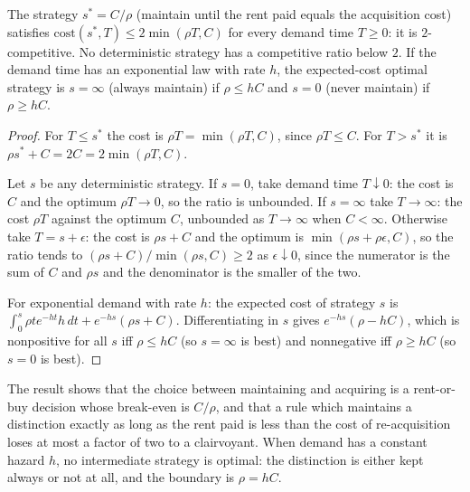 \begin{newresult}\label{thm:rent}
The strategy $s^*=C/\rho$ (maintain until the rent paid equals the acquisition cost) satisfies $\mathrm{cost}(s^*,T)\le2\min(\rho T,C)$ for every demand time $T\ge0$: it is $2$-competitive. No deterministic strategy has a competitive ratio below $2$. If the demand time has an exponential law with rate $h$, the expected-cost optimal strategy is $s=\infty$ (always maintain) if $\rho\le hC$ and $s=0$ (never maintain) if $\rho\ge hC$.
\end{newresult}
\begin{proof}
For $T\le s^*$ the cost is $\rho T=\min(\rho T,C)$, since $\rho T\le C$. For $T>s^*$ it is $\rho s^*+C=2C=2\min(\rho T,C)$.

Let $s$ be any deterministic strategy. If $s=0$, take demand time $T\downarrow0$: the cost is $C$ and the optimum $\rho T\to0$, so the ratio is unbounded. If $s=\infty$ take $T\to\infty$: the cost $\rho T$ against the optimum $C$, unbounded as $T\to\infty$ when $C<\infty$. Otherwise take $T=s+\epsilon$: the cost is $\rho s+C$ and the optimum is $\min(\rho s+\rho\epsilon,C)$, so the ratio tends to $(\rho s+C)/\min(\rho s,C)\ge2$ as $\epsilon\downarrow0$, since the numerator is the sum of $C$ and $\rho s$ and the denominator is the smaller of the two.

For exponential demand with rate $h$: the expected cost of strategy $s$ is $\int_0^s\rho te^{-ht}h\,dt+e^{-hs}(\rho s+C)$. Differentiating in $s$ gives $e^{-hs}(\rho-hC)$, which is nonpositive for all $s$ iff $\rho\le hC$ (so $s=\infty$ is best) and nonnegative iff $\rho\ge hC$ (so $s=0$ is best).
\end{proof}

The result shows that the choice between maintaining and acquiring is a rent-or-buy decision whose break-even is $C/\rho$, and that a rule which maintains a distinction exactly as long as the rent paid is less than the cost of re-acquisition loses at most a factor of two to a clairvoyant. When demand has a constant hazard $h$, no intermediate strategy is optimal: the distinction is either kept always or not at all, and the boundary is $\rho=hC$.

